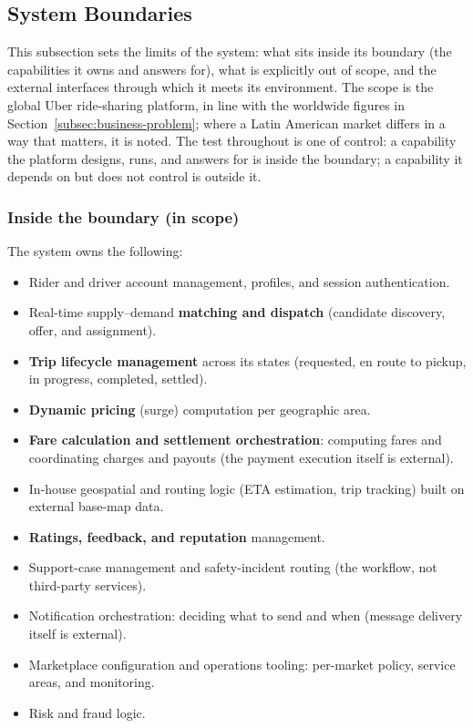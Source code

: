 \subsection{System Boundaries}
\label{subsec:boundaries}

This subsection sets the limits of the system: what sits inside its boundary
(the capabilities it owns and answers for), what is explicitly out of scope,
and the external interfaces through which it meets its environment. The scope
is the global Uber ride-sharing platform, in line with the worldwide figures
in Section~\ref{subsec:business-problem}; where a Latin American market
differs in a way that matters, it is noted. The test throughout is one of
control: a capability the platform designs, runs, and answers for is inside
the boundary; a capability it depends on but does not control is outside it.

\subsubsection*{Inside the boundary (in scope)}

The system owns the following:

\begin{itemize}[leftmargin=1.4em,itemsep=0.15em]
  \item Rider and driver account management, profiles, and session
        authentication.
  \item Real-time supply--demand \textbf{matching and dispatch} (candidate
        discovery, offer, and assignment).
  \item \textbf{Trip lifecycle management} across its states (requested, en
        route to pickup, in progress, completed, settled).
  \item \textbf{Dynamic pricing} (surge) computation per geographic area.
  \item \textbf{Fare calculation and settlement orchestration}: computing
        fares and coordinating charges and payouts (the payment execution
        itself is external).
  \item In-house geospatial and routing logic (ETA estimation, trip
        tracking) built on external base-map data.
  \item \textbf{Ratings, feedback, and reputation} management.
  \item Support-case management and safety-incident routing (the workflow,
        not third-party services).
  \item Notification orchestration: deciding what to send and when (message
        delivery itself is external).
  \item Marketplace configuration and operations tooling: per-market policy,
        service areas, and monitoring.
  \item Risk and fraud logic.
\end{itemize}

